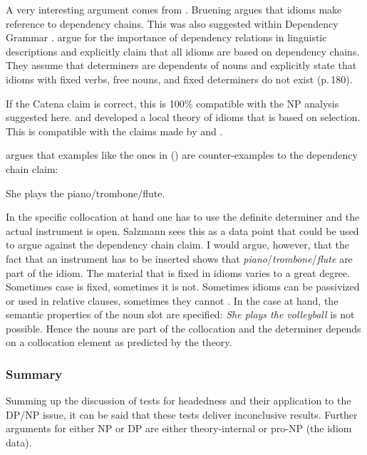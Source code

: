 \documentclass[output=paper
  ,nobabel
  ,draftmode
  ,uniformtopskip %
  ,colorlinks, citecolor=brown
]{langscibook}
\begin{document}

A very interesting argument comes from \citet[Section~5]{Bruening2020a}. Bruening argues that idioms make reference to
dependency chains. This was also suggested within Dependency Grammar
\parencites{OGrady98a-u}[Section~4.2]{OG2012a-u}. \citet[Section~4.2]{OG2012a-u}
argue for the importance of dependency relations in linguistic descriptions and explicitly claim
that all idioms are based on dependency chains. They assume that determiners are dependents of nouns
and explicitly state that idioms with fixed verbs, free nouns, and fixed determiners do not exist (p.\,180). 

\largerpage
If the Catena claim is correct, this is 100\% compatible with the NP analysis suggested
here. \citet{Sag2007a} and \citet*{KSF2015a} developed a local theory of idioms that is based on
selection. This is compatible with the claims made by \citet{Bruening2020a} and
\citet[Section~4.2]{OG2012a-u}.

\citet[]{Salzmann2020a} argues that examples like the ones in () are counter-examples to the
dependency chain claim:

\ea
She plays the piano/trombone/flute.
\z

\noindent
In the specific collocation at hand one has to use the definite determiner and the actual instrument
is open. Salzmann sees this as a data point that could be used to argue against the dependency chain
claim. I would argue, however, that the fact that an instrument has to be inserted shows that
\emph{piano}/\emph{trombone}/\emph{flute} are part of the idiom. The material that is fixed in idioms varies to a great
degree. Sometimes case is fixed, sometimes it is not. Sometimes idioms can be passivized or used in
relative clauses, sometimes they cannot \citep{NSW94a}. In the case at hand, the semantic properties of the noun
slot are specified: \emph{She plays the volleyball} is not possible. Hence the nouns are part of
the collocation and the determiner depends on a collocation element as predicted by the theory.


\subsubsection{Summary}

Summing up the discussion of  tests for headedness and their application to the DP/NP issue, it
can be said that these tests deliver inconclusive results. Further arguments for either NP or DP are
either theory-internal or pro-NP (the idiom data).
\end{document}
